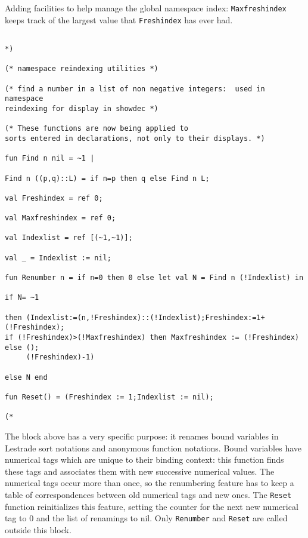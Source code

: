 \documentclass{article}
\begin{document}
Adding facilities to help manage the global namespace index:  {\tt Maxfreshindex} keeps track of the largest value that {\tt Freshindex} has ever had.

\begin{verbatim}

*)

(* namespace reindexing utilities *)

(* find a number in a list of non negative integers:  used in namespace
reindexing for display in showdec *)

(* These functions are now being applied to
sorts entered in declarations, not only to their displays. *)

fun Find n nil = ~1 |

Find n ((p,q)::L) = if n=p then q else Find n L;

val Freshindex = ref 0;

val Maxfreshindex = ref 0;

val Indexlist = ref [(~1,~1)];

val _ = Indexlist := nil;

fun Renumber n = if n=0 then 0 else let val N = Find n (!Indexlist) in

if N= ~1

then (Indexlist:=(n,!Freshindex)::(!Indexlist);Freshindex:=1+(!Freshindex); 
if (!Freshindex)>(!Maxfreshindex) then Maxfreshindex := (!Freshindex) else ();
     (!Freshindex)-1)

else N end

fun Reset() = (Freshindex := 1;Indexlist := nil);

(*

\end{verbatim}

The block above has a very specific purpose:  it renames bound variables in Lestrade sort notations and anonymous function notations.  Bound variables have numerical tags which are unique to their binding context:  this function finds these tags and associates them with new successive numerical values.
The numerical tags occur more than once, so the renumbering feature has to keep a table of correspondences between old numerical tags and new ones.  The {\tt Reset} function reinitializes this feature, setting the counter for the next new numerical tag to 0 and the list of renamings to nil.  Only {\tt Renumber} and {\tt Reset} are called outside this block.
\end{document}
